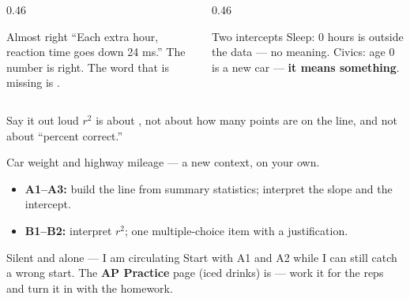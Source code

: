 \documentclass[aspectratio=169, 11pt]{beamer}
\begin{document}
\begin{frame}[t, plain]
  \vspace{6pt}
  \begin{columns}[t]
    \begin{column}{0.46\textwidth}
      \begin{block}{Almost right}
        ``Each extra hour, reaction time goes down 24 ms.'' The number is right. The word
        that is missing is .
      \end{block}
    \end{column}
    \begin{column}{0.46\textwidth}
      \begin{block}{Two intercepts}
        Sleep: 0 hours is outside the data --- no meaning. Civics: age 0 is a new car ---
        \textbf{it means something}.
      \end{block}
    \end{column}
  \end{columns}
  \vspace{12pt}
  \begin{block}{Say it out loud}
    $r^2$ is about , not about how many points are on the line, and
    not about ``percent correct.''
  \end{block}
\end{frame}

\begin{frame}[t, plain]
  Car weight and highway mileage --- a new context, on your own.
  \begin{itemize}\setlength{\itemsep}{4pt}
    \item \textbf{A1--A3:} build the line from summary statistics; interpret the slope and
          the intercept.
    \item \textbf{B1--B2:} interpret $r^2$; one multiple-choice item with a justification.
  \end{itemize}
  \begin{block}{Silent and alone --- I am circulating}
    Start with A1 and A2 while I can still catch a wrong start. The \textbf{AP Practice} page
    (iced drinks) is  --- work it for the reps and turn it in with the homework.
  \end{block}
\end{frame}
\end{document}
